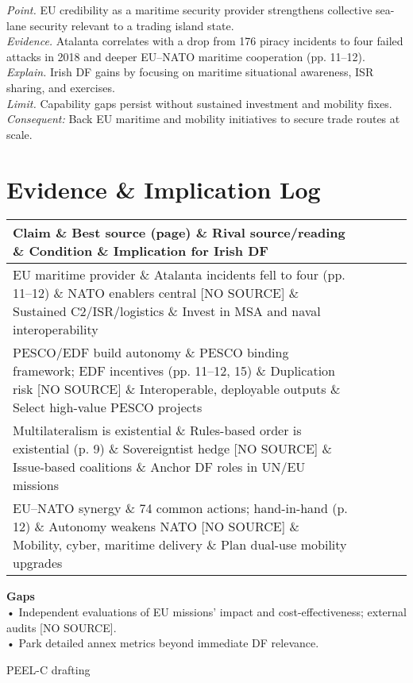 \textit{Point.} EU credibility as a maritime security provider strengthens collective sea-lane security relevant to a trading island state.\\
\textit{Evidence.} Atalanta correlates with a drop from 176 piracy incidents to four failed attacks in 2018 and deeper EU–NATO maritime cooperation (pp. 11–12).\\
\textit{Explain.} Irish DF gains by focusing on maritime situational awareness, ISR sharing, and exercises.\\
\textit{Limit.} Capability gaps persist without sustained investment and mobility fixes.\\
\textit{Consequent:} Back EU maritime and mobility initiatives to secure trade routes at scale.

\section*{Evidence \& Implication Log}
\begin{tabular}{p{3.2cm}p{4.2cm}p{3.6cm}p{3.2cm}p{4.2cm}}
	\textbf{Claim} \& \textbf{Best source (page)} \& \textbf{Rival source/reading} \& \textbf{Condition} \& \textbf{Implication for Irish DF}\\\hline
	EU maritime provider \& Atalanta incidents fell to four (pp. 11–12) \& NATO enablers central [NO SOURCE] \& Sustained C2/ISR/logistics \& Invest in MSA and naval interoperability\\
	PESCO/EDF build autonomy \& PESCO binding framework; EDF incentives (pp. 11–12, 15) \& Duplication risk [NO SOURCE] \& Interoperable, deployable outputs \& Select high-value PESCO projects\\
	Multilateralism is existential \& Rules-based order is existential (p. 9) \& Sovereigntist hedge [NO SOURCE] \& Issue-based coalitions \& Anchor DF roles in UN/EU missions\\
	EU–NATO synergy \& 74 common actions; hand-in-hand (p. 12) \& Autonomy weakens NATO [NO SOURCE] \& Mobility, cyber, maritime delivery \& Plan dual-use mobility upgrades\\\hline
\end{tabular}

\textbf{Gaps}\\
• Independent evaluations of EU missions’ impact and cost-effectiveness; external audits [NO SOURCE].\\
• Park detailed annex metrics beyond immediate DF relevance.

PEEL-C drafting

